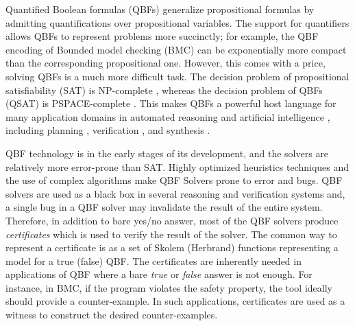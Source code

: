 \documentclass[runningheads]{llncs}
\newcommand{\0}{0}
\newcommand{\1}{1}
\begin{document}
Quantified Boolean formulas (QBFs) generalize propositional formulas by admitting quantifications over propositional variables. 
The support for quantifiers allows QBFs to represent problems more succinctly; for example, the QBF encoding of Bounded model checking (BMC) \cite{DershowitzHK05} can be exponentially more compact than the corresponding propositional one. However, this comes with a price, solving QBFs is a much more difficult task. The decision problem of propositional satisfiability (SAT) is NP-complete \cite{Cook71}, whereas the decision problem of QBFs (QSAT) is PSPACE-complete \cite{StockmeyerM73}. This makes QBFs a powerful host language for many application domains in automated reasoning and artificial intelligence \cite{ShuklaBPS19}, including planning \cite{AnsoteguiGS05, EglyKLP17, Cashmore2012planning, Gasquet18}, verification \cite{MillerSB13}, and synthesis \cite{BloemKS14, BloemEKKL14, Gange2014synthesizing}. 

QBF technology is in the early stages of its development, and the solvers are relatively more error-prone than SAT.  Highly optimized heuristics techniques and the use of complex algorithms make QBF Solvers prone to error and bugs.  QBF solvers are used as a black box in several reasoning and verification systems and, a single bug in a QBF solver may invalidate the result of the entire system. Therefore, in addition to bare yes/no answer, most of the QBF solvers produce \textit{certificates} \cite{Balabanov2015, RabeS16, BalabanovJ12, Benedetti05, NarizzanoPPT09, NiemetzPLSB12, JussilaBSKW07, GoultiaevaGB11, Van2013, HeuleSB17} which is used to verify the result of the solver. The common way to represent a certificate is as a set of Skolem (Herbrand) functions representing a model for a true (false) QBF. The certificates are inherently needed in applications of QBF where a bare \textit{true} or \textit{false} answer is not enough. For instance, in BMC, if the program violates the safety property, the tool ideally should provide a counter-example. In such applications, certificates are used as a witness to construct the desired counter-examples. 

\end{document}
